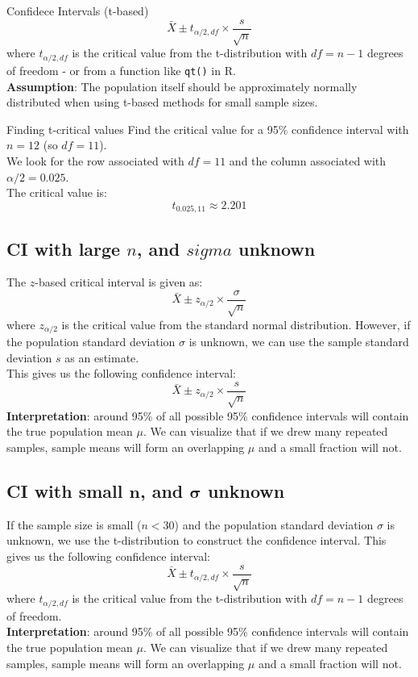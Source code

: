 \documentclass[10pt]{extarticle}
\begin{document}
\vfill
\begin{definitionbox}{Confidece Intervals (t-based)}{}
    $$\bar{X} \pm t_{\alpha/2, df} \times \frac{s}{\sqrt{n}}$$
    where $t_{\alpha/2, df}$ is the critical value from the t-distribution with $df = n - 1$ degrees of freedom - or from a function like \texttt{qt()} in R.\\

    \textbf{Assumption}: The population itself should be approximately normally distributed when using t-based methods for small sample sizes.
\end{definitionbox}
\vfill
\begin{examplebox}{Finding t-critical values}{}
    Find the critical value for a 95\% confidence interval with $n = 12$ (so $df = 11$).\\
    We look for the row associated with $df = 11$ and the column associated with $\alpha/2 = 0.025$.\\
    The critical value is:
    $$t_{0.025, 11} \approx 2.201$$
\end{examplebox}
\pagebreak
\subsection{CI with large $n$, and $sigma$ unknown}
The $z$-based critical interval is given as:
$$\bar{X} \pm z_{\alpha/2} \times \frac{\sigma}{\sqrt{n}}$$
where $z_{\alpha/2}$ is the critical value from the standard normal distribution.
However, if the population standard deviation $\sigma$ is unknown, we can use the sample standard deviation $s$ as an estimate.\\
This gives us the following confidence interval:
$$\bar{X} \pm z_{\alpha/2} \times \frac{s}{\sqrt{n}}$$
\textbf{Interpretation}: around 95\% of all possible 95\% confidence intervals will contain the true population mean $\mu$. We can visualize that if we drew many repeated samples, sample means will form an overlapping $\mu$ and a small fraction will not.

\subsection{CI with small $\boldsymbol{n}$, and $\boldsymbol{\sigma}$ unknown}
If the sample size is small ($n < 30$) and the population standard deviation $\sigma$ is unknown, we use the t-distribution to construct the confidence interval. This gives us the following confidence interval:
$$\bar{X} \pm t_{\alpha/2, df} \times \frac{s}{\sqrt{n}}$$
where $t_{\alpha/2, df}$ is the critical value from the t-distribution with $df = n - 1$ degrees of freedom.\\
\textbf{Interpretation}: around 95\% of all possible 95\% confidence intervals will contain the true population mean $\mu$. We can visualize that if we drew many repeated samples, sample means will form an overlapping $\mu$ and a small fraction will not.
\end{document}
